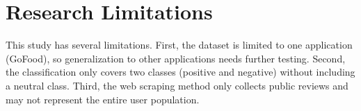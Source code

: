 \section{Research Limitations}

This study has several limitations. First, the dataset is limited to one application (GoFood), so generalization to other applications needs further testing. Second, the classification only covers two classes (positive and negative) without including a neutral class. Third, the web scraping method only collects public reviews and may not represent the entire user population.
